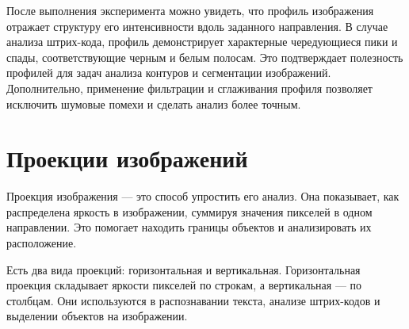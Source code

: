 \documentclass[a4paper,12pt]{article}
\begin{document}
После выполнения эксперимента можно увидеть, что профиль изображения отражает структуру его интенсивности вдоль заданного направления. В случае анализа штрих-кода, профиль демонстрирует характерные чередующиеся пики и спады, соответствующие черным и белым полосам. Это подтверждает полезность профилей для задач анализа контуров и сегментации изображений. Дополнительно, применение фильтрации и сглаживания профиля позволяет исключить шумовые помехи и сделать анализ более точным.

\section{Проекции изображений}

Проекция изображения — это способ упростить его анализ. Она показывает, как распределена яркость в изображении, суммируя значения пикселей в одном направлении. Это помогает находить границы объектов и анализировать их расположение.

Есть два вида проекций: горизонтальная и вертикальная. Горизонтальная проекция складывает яркости пикселей по строкам, а вертикальная — по столбцам. Они используются в распознавании текста, анализе штрих-кодов и выделении объектов на изображении.
\end{document}
